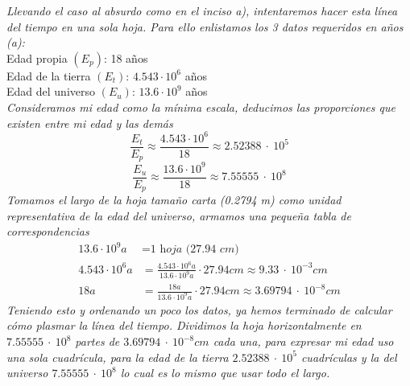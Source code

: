 \documentclass{article}
\begin{document}
\textit{Llevando el caso al absurdo como en el inciso a), intentaremos hacer esta línea del tiempo en una sola hoja. Para ello enlistamos los 3 datos requeridos en años (a):}\\
Edad propia $(E_p)$: 18 años\\
Edad de la tierra $(E_t)$: $4.543 \cdot 10^6$ años\\
Edad del universo $(E_u)$: $13.6 \cdot 10^9$ años\\
\textit{Consideramos mi edad como la mínima escala, deducimos las proporciones que existen entre mi edad y las demás}
\[ \frac{E_t}{E_p} \approx \frac{4.543 \cdot 10^6}{18} \approx 2.52388\:\cdot \:10^5 \]
\[ \frac{E_u}{E_p} \approx \frac{13.6 \cdot 10^9}{18} \approx  7.55555\:\cdot \:10^8\]
\textit{Tomamos el largo de la hoja tamaño carta (0.2794 m) como unidad representativa de la edad del universo, armamos una pequeña tabla de correspondencias}
\begin{align*}
    13.6 \cdot 10^9a &= \textit{1 hoja (27.94 cm)} \\
    4.543 \cdot 10^6a &= \frac{4.543 \cdot 10^6a}{13.6 \cdot 10^9a} \cdot 27.94cm \approx 9.33\:\cdot \:10^{-3} cm \\
    18a &= \frac{18a}{13.6 \cdot 10^9a} \cdot 27.94cm \approx 3.69794\:\cdot \:10^{-8}cm
\end{align*}
\textit{Teniendo esto y ordenando un poco los datos, ya hemos terminado de calcular cómo plasmar la línea del tiempo. Dividimos la hoja horizontalmente en $7.55555\:\cdot \:10^8$ partes de $3.69794\:\cdot \:10^{-8}cm$ cada una, para expresar mi edad uso una sola cuadrícula, para la edad de la tierra $2.52388\:\cdot \:10^5$ cuadrículas y la del universo $7.55555\:\cdot \:10^8$ lo cual es lo mismo que usar todo el largo.}
\end{document}
